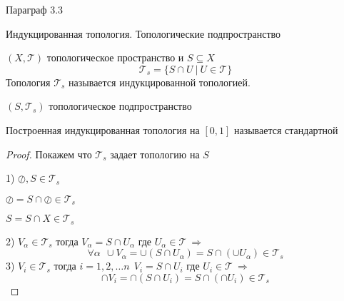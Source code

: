\begin{title}[\Large]
  Параграф 3.3
\end{title}

\begin{title}[\Large]
  Индукцированная топология. Топологические подпространство
\end{title}

\begin{define}
  $(X, \mathcal{T})$ топологическое пространство и $S \subseteq X$
  $$
  \mathcal{T}_s = \{ S \cap U ~ | ~ U \in \mathcal{T} \}
  $$
  Топология $\mathcal{T}_s$ называется индукцированной топологией.

  $(S, \mathcal{T}_s)$ топологическое подпространство

  Построенная индукцированная топология на $[0,1]$ называется стандартной
\end{define}

\begin{proof}
  Покажем что $\mathcal{T}_s$ задает топологию на $S$

  1) $\oslash, S \in \mathcal{T}_s$

  $\oslash = S \cap \oslash \in \mathcal{T}_s$

  $S = S \cap X \in \mathcal{T}_s$

  2) $V_{\alpha} \in \mathcal{T}_s$ тогда
  $V_{\alpha} = S \cap U_{\alpha}$ где $U_{\alpha} \in \mathcal{T} ~
  \Rightarrow$
  $$
  \forall \alpha ~~ \cup V_{\alpha} =
  \cup(S \cap U_{\alpha}) = S \cap (\cup U_{\alpha}) \in \mathcal{T}_s
  $$
  3) $V_i \in \mathcal{T}_s$ тогда
  $i = 1,2, \ldots n ~~ V_i = S \cap U_i$ где $U_i \in \mathcal{T} ~
  \Rightarrow$
  $$
  \cap V_i = \cap(S \cap U_i) = S \cap (\cap U_i) \in \mathcal{T}_s
  $$
\end{proof}